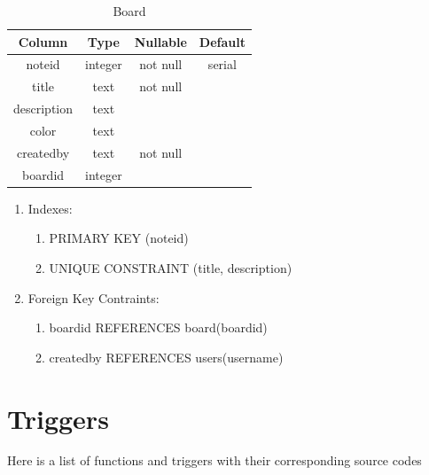\documentclass[conference,onecolumn]{IEEEtran}
\begin{document}
\begin{table}[htbp]
  \caption{Board}
  \begin{center}
    \begin{tabular}{|c|c|c|c|}
      \hline
      \textbf{Column} & \textbf{Type} & \textbf{Nullable} & \textbf{Default}\\
      \hline
      noteid & integer & not null & serial\\
      title & text & not null &\\
      description & text &&\\
      color & text &&\\
      createdby & text & not null &\\
      boardid & integer &&\\
      \hline
    \end{tabular}
    \begin{enumerate}
    \item Indexes:
      \begin{enumerate}
      \item PRIMARY KEY (noteid)
      \item UNIQUE CONSTRAINT (title, description)
      \end{enumerate}
    \item Foreign Key Contraints:
      \begin{enumerate}
      \item boardid REFERENCES board(boardid)
      \item createdby REFERENCES users(username)
      \end{enumerate}
    \end{enumerate}
    \label{note}
  \end{center}
\end{table}


\newpage
\section{Triggers}

Here is a list of functions and triggers with their corresponding source codes
\end{document}
